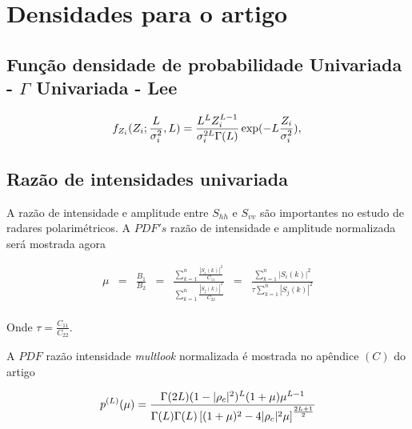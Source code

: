 \section{Densidades para o artigo}
\subsection{Função densidade de probabilidade Univariada - $\Gamma$ Univariada - Lee}
\begin{equation}\label{cap_acf_23}
	f_{Z_{i}}(Z_{i};\frac{L}{\sigma_{i}^2},L)=\frac{L^{L}Z_{i}^{L-1}}{\sigma_{i}^{2L}\Gamma(L)} \exp(-L\frac{Z_{i}}{\sigma_{i}^2}), \\
\end{equation}

\subsection{Razão de intensidades univariada}
A razão de intensidade e amplitude entre $S_{hh}$ e $S_{vv}$ são importantes no estudo de radares polarimétricos. A $PDF's$ razão de intensidade e amplitude normalizada será mostrada agora

\begin{equation}\label{eqn63}
\begin{array}{ccccccc}
	\mu&=&\frac{B_1}{B_2}&=&\frac{\sum_{k=1}^{n}\frac{|S_i(k)|^2}{C_{11}}}{\sum_{k=1}^{n}\frac{|S_j(k)|^2}{C_{22}}}&=&\frac{\sum_{k=1}^{n}|S_i(k)|^2}{\tau\sum_{k=1}^{n}|S_j(k)|^2}\\
\end{array}
\end{equation}

Onde $\tau=\frac{C_{11}}{C_{22}}$.

A $PDF$ razão intensidade {\it multlook} normalizada é mostrada no apêndice $(C)$ do artigo \cite{lee}  


\begin{equation}\label{eqn64}
	p^{(L)}(\mu)=\frac{\Gamma(2L)(1-|\rho_c|^2)^{L}(1+\mu)\mu^{L-1}}{\Gamma(L)\Gamma(L)\left[(1+\mu)^2-4|\rho_c|^2\mu \right]^{\frac{2L+1}{2}}}\\
\end{equation}

